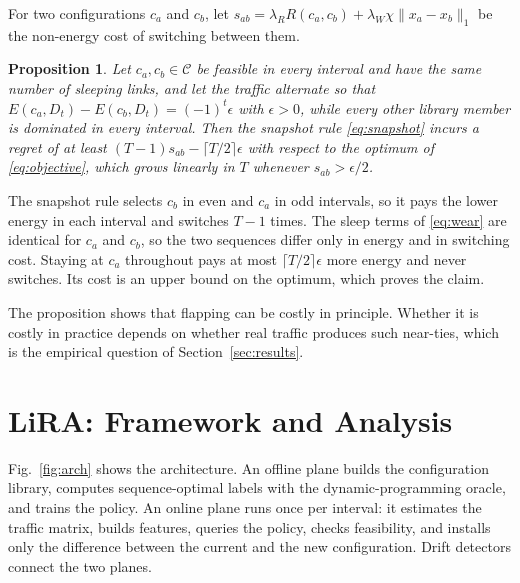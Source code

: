 \documentclass[journal]{IEEEtran}
\newtheorem{proposition}{Proposition}
\begin{document}
For two configurations $c_a$ and $c_b$, let $s_{ab}=\lambda_R R(c_a,c_b)+\lambda_W\chi\|x_a-x_b\|_1$ be the non-energy cost of switching between them.

\begin{proposition}\label{prop:snapshot}
Let $c_a,c_b\in\mathcal{C}$ be feasible in every interval and have the same number of sleeping links, and let the traffic alternate so that $E(c_a,D_t)-E(c_b,D_t)=(-1)^t\epsilon$ with $\epsilon>0$, while every other library member is dominated in every interval. Then the snapshot rule \eqref{eq:snapshot} incurs a regret of at least $(T-1)s_{ab}-\lceil T/2\rceil\epsilon$ with respect to the optimum of \eqref{eq:objective}, which grows linearly in $T$ whenever $s_{ab}>\epsilon/2$.
\end{proposition}
\begin{IEEEproof}
The snapshot rule selects $c_b$ in even and $c_a$ in odd intervals, so it pays the lower energy in each interval and switches $T-1$ times. The sleep terms of \eqref{eq:wear} are identical for $c_a$ and $c_b$, so the two sequences differ only in energy and in switching cost. Staying at $c_a$ throughout pays at most $\lceil T/2\rceil\epsilon$ more energy and never switches. Its cost is an upper bound on the optimum, which proves the claim.
\end{IEEEproof}

The proposition shows that flapping can be costly in principle. Whether it is costly in practice depends on whether real traffic produces such near-ties, which is the empirical question of Section~\ref{sec:results}.

\section{LiRA: Framework and Analysis}\label{sec:framework}

Fig.~\ref{fig:arch} shows the architecture. An offline plane builds the configuration library, computes sequence-optimal labels with the dynamic-programming oracle, and trains the policy. An online plane runs once per interval: it estimates the traffic matrix, builds features, queries the policy, checks feasibility, and installs only the difference between the current and the new configuration. Drift detectors connect the two planes.
\end{document}
